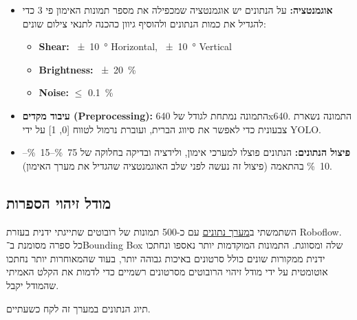 \begin{itemize}
  \item \textbf{אוגמנטציה:} על הנתונים יש אוגמנטציה שמכפילה את מספר תמונות האימון
  פי 3 כדי להגדיל את כמות הנתונים ולהוסיף גיוון כהכנה לתנאי צילום שונים:
  \begin{english}
    \begin{itemize}
    \item \textbf{Shear:} \qty{+-10}{\degree} Horizontal, \qty{+-10}{\degree} Vertical
    \item \textbf{Brightness:} \qty{+-20}{\percent}
    \item \textbf{Noise:} $\leq$ \qty{0.1}{\percent}
    \end{itemize}
  \end{english}

\item \textbf{עיבוד מקדים (\textenglish{Preprocessing}):} התמונה נמתחת
  לגודל של \textenglish{640x640}. התמונה נשארת צבעונית כדי לאפשר את
  סיווג הברית, ועוברת נרמול לטווח [0, 1] על ידי \textenglish{YOLO}.
  
\item \textbf{פיצול הנתונים:} הנתונים פוצלו למערכי אימון, ולידציה
  ובדיקה בחלוקה של
  \textenglish{\qty{75}{\percent}--\qty{15}{\percent}--\qty{10}{\percent}}
  בהתאמה (פיצול זה נעשה לפני שלב האוגמנטציה שהגדיל את מערך האימון).
\end{itemize}

\subsection{מודל זיהוי הספרות}

השתמשתי
ב\href{https://app.roboflow.com/new-workspace-pyain/nums-llmwb/13}{מערך
  נתונים} עם כ-500 תמונות של רובוטים שתייגתי ידנית בעזרת
\textenglish{Roboflow}. כל ספרה מסומנת ב־\textenglish{Bounding Box}
שלה ומסווגת. התמונות המוקדמות יותר נאספו ונחתכו ידנית ממקורות שונים
כולל סרטונים באיכות גבוהה יותר, בעוד שהמאוחרות יותר נחתכו אוטומטית על
ידי מודל זיהוי הרובוטים מסרטונים רשמיים כדי לדמות את הקלט האמיתי
שהמודל יקבל.

תיוג הנתונים במערך זה לקח כשעתיים.


